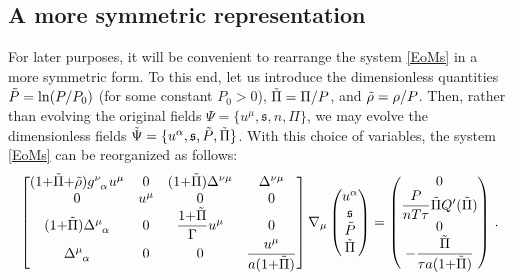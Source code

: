 \documentclass[a4paper, amsfonts, amssymb, amsmath, reprint, showkeys, nofootinbib, twoside,notitlepage,onecolumn]{revtex4-2}
\newcommand{\s}{{\mathfrak{s}}}
\theoremstyle{definition}
\theoremstyle{theorem}
\theoremstyle{corollary}
\begin{document}

\vspace{-0.4cm}
\subsection{A more symmetric representation}
\vspace{-0.4cm}

For later purposes, it will be convenient to rearrange the system \eqref{EoMs} in a more symmetric form. To this end, let us introduce the dimensionless quantities
$\Tilde{P}=\ln(P/P_0)$ (for some constant $P_0>0$), $\Tilde{\Pi}=\Pi/P$, and $\Tilde{\rho}=\rho/P$. Then, rather than evolving the original fields  $\Psi=\{u^\mu ,\s, n,\Pi\}$, we may evolve the dimensionless fields 
$\Tilde{\Psi}=\{u^\alpha,\s,\Tilde{P},\Tilde{\Pi}\}$. With this choice of variables, the system \eqref{EoMs} can be reorganized as follows:
\begin{equation}\label{SymmetrzedEoMs}
\begin{bmatrix}
(1{+}\Tilde{\Pi}{+}\Tilde{\rho})g\indices{^\nu _\alpha}u^\mu & 0 & (1{+}\Tilde{\Pi})\Delta^{\nu \mu} & \Delta^{\nu \mu}\\
0 & u^\mu & 0 & 0\\
(1{+}\Tilde{\Pi})\Delta\indices{^\mu _\alpha} & 0 & \dfrac{1{+}\Tilde{\Pi}}{\Gamma} u^\mu & 0\\
\Delta\indices{^\mu _\alpha} & 0 & 0 & \dfrac{u^\mu}{a(1{+}\Tilde{\Pi})}\\
\end{bmatrix}
\nabla_\mu \begin{pmatrix}
u^\alpha \\
\s \\
\Tilde{P} \\
\Tilde{\Pi}
\end{pmatrix} =
\begin{pmatrix}
0\\
\dfrac{P}{nT\tau} \Tilde{\Pi} Q'(\Tilde{\Pi})\\
0\\
 -\dfrac{\Tilde{\Pi}}{\tau a(1{+}\Tilde{\Pi})}\\
\end{pmatrix} \, .
\end{equation}
\end{document}
